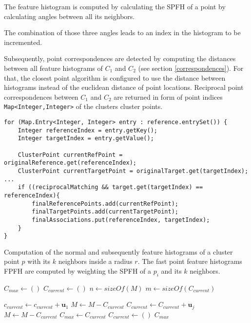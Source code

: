 
The feature histogram is computed by calculating the SPFH of a point by calculating angles between all its neighbors.



The combination of those three angles leads to an index in the histogram to be incremented. 





Subsequently, point correspondences are detected by computing the distances between all feature histograms of $C_1$ and $C_2$ (see section \ref{correspondences}). For that, the closest point algorithm is configured to use the distance between histograms instead of the euclidean distance of point locations. Reciprocal point correspondences between $C_1$ and $C_2$ are returned in form of point indices \texttt{Map<Integer,Integer>}  of the clusters cluster points.
\begin{lstlisting}
for (Map.Entry<Integer, Integer> entry : reference.entrySet()) {
	Integer referenceIndex = entry.getKey();
	Integer targetIndex = entry.getValue();

	ClusterPoint currentRefPoint = originalReference.get(referenceIndex);
	ClusterPoint currentTargetPoint = originalTarget.get(targetIndex);
...
	if ((reciprocalMatching && target.get(targetIndex) == referenceIndex){
		finalReferencePoints.add(currentRefPoint);
		finalTargetPoints.add(currentTargetPoint);
		finalAssociations.put(referenceIndex, targetIndex);
	}
}
\end{lstlisting}
\begin{algorithm}[tbp]
	\caption{Computation of the normal and subsequently feature histograms of a cluster point $p$ with its $k$ neighbors inside a radius $r$. The fast point feature histograms FPFH are computed by weighting the SPFH of a $p_i$ and its $k$ neighbors.}
	
	\begin{algorithmic}[1]     %
		\label{featureHistograms}
		
		\State $\mathit{C_{max}} \gets ()$
		\State $\mathit{C_{current}} \gets ()$
		\State $n \gets \mathit{sizeOf}(M)$
		\State $m \gets \mathit{sizeOf}(C_{current})$
		
		\State $\mathit{c_{current}} \gets \mathit{c_{current}} + \boldsymbol{u}_1$
		\State $M \gets M - C_{current}$
		\State $C_{current} \gets C_{current} + \boldsymbol{u}_j$
		\EndIf
		\EndFor
		\EndFor
		\State $M \gets M - C_{current}$
		\State $C_{max} \gets C_{current}$
		\EndIf
		\State $C_{current} \gets ()$
		\EndWhile
		\State\Return $C_{max}$
		\EndProcedure	
	\end{algorithmic}
\end{algorithm}

